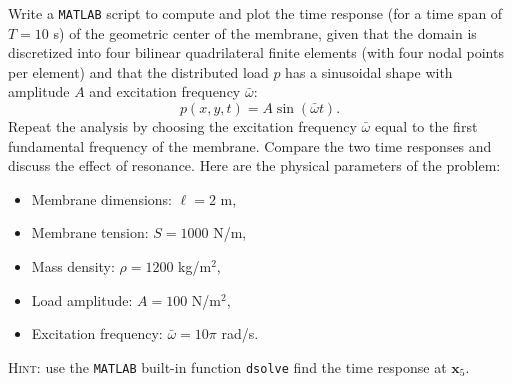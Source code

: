 \documentclass[12pt]{article}
\begin{document}
Write a \texttt{MATLAB} script to compute and plot the time response (for a time span of $T=10$ s) of the geometric center of the membrane, given that the domain is discretized into four bilinear quadrilateral finite elements (with four nodal points per element) and that the distributed load $p$ has a sinusoidal shape with amplitude $A$ and excitation frequency $\bar\omega$:
$$p(x,y,t)=A\sin(\bar\omega t).$$
Repeat the analysis by choosing the excitation frequency $\bar{\omega}$ equal to the first fundamental frequency of the membrane. Compare the two time responses and discuss the effect of resonance. Here are the physical parameters of the problem:
\begin{itemize}
    \item Membrane dimensions: $\ell=2$ m,
    \item Membrane tension: $S=1000$ N/m,
    \item Mass density: $\rho=1200$ kg/m$^2$,
    \item Load amplitude: $A=100$ N/m$^2$,
    \item Excitation frequency: $\bar\omega =10\pi$ rad/s.
\end{itemize}
\textsc{Hint}: use the \texttt{MATLAB} built-in function \texttt{dsolve} find the time response at $\mathbf x_5$.

\end{document}
